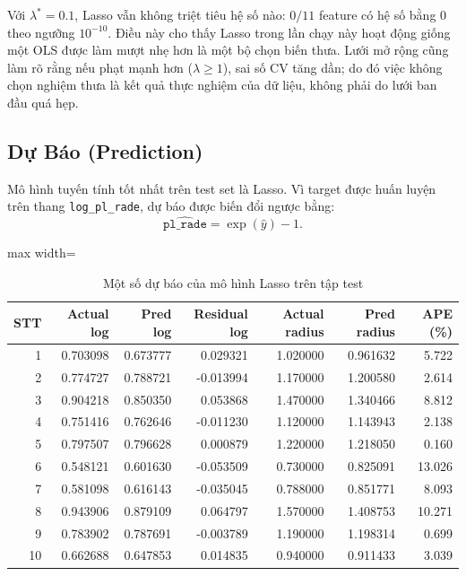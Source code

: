 Với $\lambda^* = 0.1$, Lasso vẫn không triệt tiêu hệ số nào: $0/11$ feature có hệ số bằng
0 theo ngưỡng $10^{-10}$. Điều này cho thấy Lasso trong lần chạy này hoạt động giống một OLS được
làm mượt nhẹ hơn là một bộ chọn biến thưa. Lưới mở rộng cũng làm rõ rằng nếu phạt mạnh hơn
($\lambda \ge 1$), sai số CV tăng dần; do đó việc không chọn nghiệm thưa là kết quả thực nghiệm
của dữ liệu, không phải do lưới ban đầu quá hẹp.

\subsection{Dự Báo (Prediction)}

Mô hình tuyến tính tốt nhất trên test set là Lasso. Vì target được huấn luyện trên thang
\texttt{log\_pl\_rade}, dự báo được biến đổi ngược bằng:
\begin{equation}
    \widehat{\texttt{pl\_rade}} = \exp(\hat{y}) - 1.
\end{equation}

\begin{table}[H]
\centering
\caption{Một số dự báo của mô hình Lasso trên tập test}
\label{tab:part2_prediction_sample}
\small
\renewcommand{\arraystretch}{1.0}
\begin{adjustbox}{max width=\textwidth}
\begin{tabular}{@{}rrrrrrr@{}}
\hline
\textbf{STT} & \textbf{Actual log} & \textbf{Pred log} & \textbf{Residual log} &
\textbf{Actual radius} & \textbf{Pred radius} & \textbf{APE (\%)} \\
\hline
1 & 0.703098 & 0.673777 & 0.029321 & 1.020000 & 0.961632 & 5.722 \\
2 & 0.774727 & 0.788721 & -0.013994 & 1.170000 & 1.200580 & 2.614 \\
3 & 0.904218 & 0.850350 & 0.053868 & 1.470000 & 1.340466 & 8.812 \\
4 & 0.751416 & 0.762646 & -0.011230 & 1.120000 & 1.143943 & 2.138 \\
5 & 0.797507 & 0.796628 & 0.000879 & 1.220000 & 1.218050 & 0.160 \\
6 & 0.548121 & 0.601630 & -0.053509 & 0.730000 & 0.825091 & 13.026 \\
7 & 0.581098 & 0.616143 & -0.035045 & 0.788000 & 0.851771 & 8.093 \\
8 & 0.943906 & 0.879109 & 0.064797 & 1.570000 & 1.408753 & 10.271 \\
9 & 0.783902 & 0.787691 & -0.003789 & 1.190000 & 1.198314 & 0.699 \\
10 & 0.662688 & 0.647853 & 0.014835 & 0.940000 & 0.911433 & 3.039 \\
\hline
\end{tabular}
\end{adjustbox}
\end{table}

